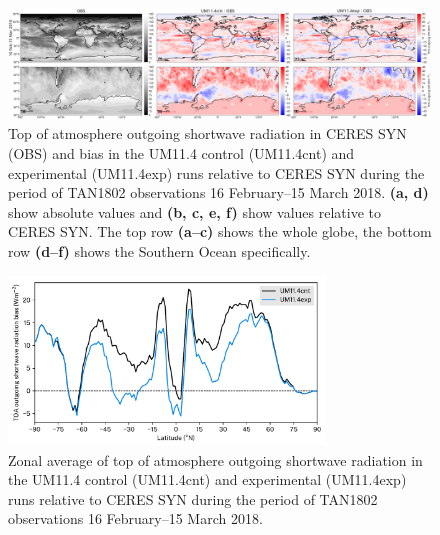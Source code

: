 \clearpage

\begin{figure}[t]
\centering
\includegraphics[width=\textwidth]{chapter4/fig/sw.png}
\caption[Top of atmosphere outgoing shortwave radiation]{Top of atmosphere outgoing shortwave radiation in CERES SYN (OBS) and
bias in the UM11.4 control (UM11.4cnt) and experimental (UM11.4exp) runs relative
to CERES SYN during the period of TAN1802 observations 16 February--15 March 2018.
\textbf{(a, d)} show absolute values and \textbf{(b, c, e, f)} show values relative
to CERES SYN. The top row \textbf{(a--c)} shows the whole globe, the bottom
row \textbf{(d--f)} shows the Southern Ocean specifically.
}
\label{fig:sw}
\end{figure}

\clearpage

\begin{figure}[t]
\centering
\includegraphics[width=0.75\textwidth]{chapter4/fig/sw_zonal.pdf}
\caption[Zonal average of top of atmosphere outgoing shortwave radiation]{
Zonal average of top of atmosphere outgoing shortwave radiation in
the UM11.4 control (UM11.4cnt) and experimental (UM11.4exp) runs relative
to CERES SYN during the period of TAN1802 observations 16 February--15 March 2018. 
}
\label{fig:sw-zonal}
\end{figure}

\clearpage


